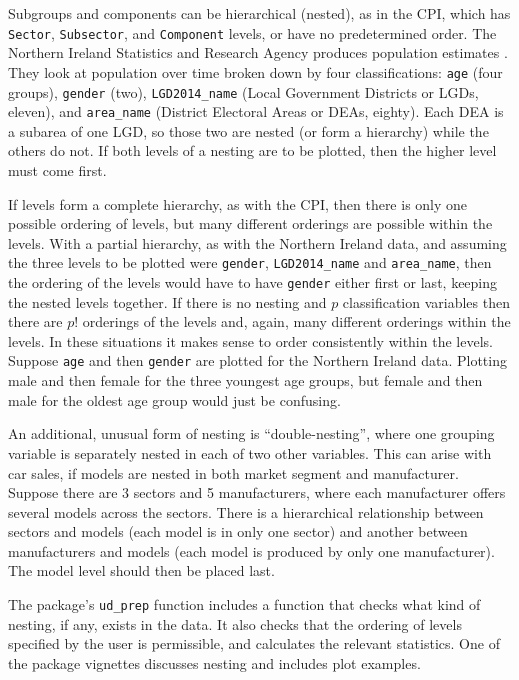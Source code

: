 Subgroups and components can be hierarchical (nested), as in the CPI, which has \texttt{Sector}, \texttt{Subsector}, and \texttt{Component} levels, or have no predetermined order. The Northern Ireland Statistics and Research Agency produces population estimates \citep{nisra:2019}. They look at population over time broken down by four classifications: \texttt{age} (four groups), \texttt{gender} (two), \texttt{LGD2014\_name} (Local Government Districts or LGDs, eleven), and \texttt{area\_name} (District Electoral Areas or DEAs, eighty). Each DEA is a subarea of one LGD, so those two are nested (or form a hierarchy) while the others do not. If both levels of a nesting are to be plotted, then the higher level must come first.

If levels form a complete hierarchy, as with the CPI, then there is only one possible ordering of levels, but many different orderings are possible within the levels. With a partial hierarchy, as with the Northern Ireland data, and assuming the three levels to be plotted were \texttt{gender}, \texttt{LGD2014\_name} and \texttt{area\_name}, then the ordering of the levels would have to have \texttt{gender} either first or last, keeping the nested levels together. If there is no nesting and \(p\) classification variables then there are \(p!\) orderings of the levels and, again, many different orderings within the levels. In these situations it makes sense to order consistently within the levels. Suppose \texttt{age} and then \texttt{gender} are plotted for the Northern Ireland data. Plotting male and then female for the three youngest age groups, but female and then male for the oldest age group would just be confusing.

An additional, unusual form of nesting is ``double-nesting'', where one grouping variable is separately nested in each of two other variables. This can arise with car sales, if models are nested in both market segment and manufacturer. Suppose there are 3 sectors and 5 manufacturers, where each manufacturer offers several models across the sectors. There is a hierarchical relationship between sectors and models (each model is in only one sector) and another between manufacturers and models (each model is produced by only one manufacturer). The model level should then be placed last.

The package's \texttt{ud\_prep} function includes a function that checks what kind of nesting, if any, exists in the data. It also checks that the ordering of levels specified by the user is permissible, and calculates the relevant statistics. One of the package vignettes discusses nesting and includes plot examples.

